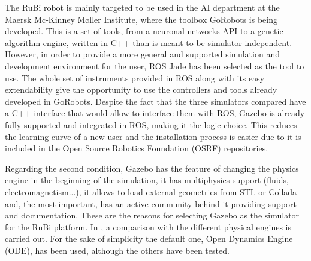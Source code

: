 The RuBi robot is mainly targeted to be used in the AI department at the Maersk Mc-Kinney Møller Institute, where the toolbox GoRobots is being developed.
This is a set of tools, from a neuronal networks API to a genetic algorithm engine, written in C++ than is meant to be simulator-independent.
However, in order to provide a more general and supported simulation and development environment for the user, ROS Jade \cite{ros} has been selected as the tool to use.
The whole set of instruments provided in ROS along with its easy extendability give the opportunity to use the controllers and tools already developed in GoRobots.
Despite the fact that the three simulators compared have a C++ interface that would allow to interface them with ROS, Gazebo is already fully supported and integrated in ROS, making it the logic choice.
This reduces the learning curve of a new user and the installation process is easier due to it is included in the Open Source Robotics Foundation (OSRF) repositories.

Regarding the second condition, Gazebo has the feature of changing the physics engine in the beginning of the simulation, it has multiphysics support (fluids, electromagnetism...), it allows to load external geometries from STL or Collada and, the most important, has an active community behind it providing support and documentation. These are the reasons for selecting Gazebo as the simulator for the RuBi platform.
In \cite{physics_engine_gazebo_comparison}, a comparison with the different physical engines is carried out.
For the sake of simplicity the default one, Open Dynamics Engine (ODE), has been used, although the others have been tested.

